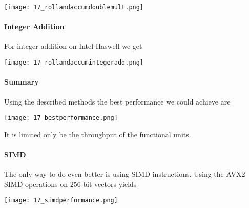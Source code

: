 \texttt{[image: 17\_rollandaccumdoublemult.png]}

\paragraph{Integer Addition}
For integer addition on Intel Haswell we get

\texttt{[image: 17\_rollandaccumintegeradd.png]}

\paragraph{Summary}
Using the described methods the best performance we could achieve are

\texttt{[image: 17\_bestperformance.png]}

It is limited only be the throughput of the functional units.

\paragraph{SIMD}
The only way to do even better is using SIMD instructions. Using the AVX2 SIMD operations on $256$-bit vectors yields

\texttt{[image: 17\_simdperformance.png]}
